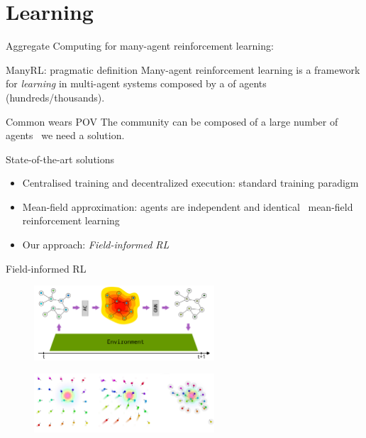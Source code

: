 \documentclass[presentation, 9pt, aspectratio=169]{beamer}\mode<presentation>{\usetheme{AMSBolognaFC}}
\begin{document}
\section{Learning}
\begin{frame}{Aggregate Computing for many-agent reinforcement learning: }
	\begin{alertblock}{ManyRL: pragmatic definition}
		Many-agent reinforcement learning is a framework for \emph{learning} in multi-agent systems composed by a  of agents (hundreds/thousands).
		
	\end{alertblock}
	\begin{exampleblock}{Common wears POV}	
		The community can be composed of a large number of agents \faArrowRight \, we need a  solution.
	\end{exampleblock}
	\begin{exampleblock}{State-of-the-art solutions}
		\begin{itemize}
			\item Centralised training and decentralized execution: standard training paradigm
			\item Mean-field approximation: agents are independent and identical \faArrowRight \, mean-field reinforcement learning
			\item Our approach: \emph{Field-informed RL}
		\end{itemize}
	\end{exampleblock}
\end{frame}
\begin{frame}{Field-informed RL}
	\begin{figure}
		\centering
		\includegraphics[width=0.6\textwidth]{img/field-informed-structure}
	\end{figure}
	\begin{figure}
		\centering
		\includegraphics[width=0.6\textwidth]{img/field-informed}
	\end{figure}
\end{frame}
\end{document}
